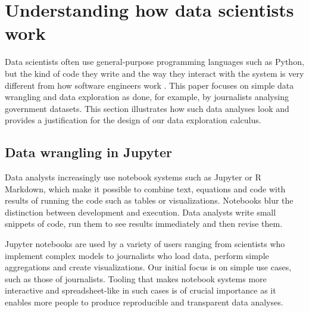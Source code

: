 \documentclass[acmsmall,anonymous,fleqn]{acmart}\settopmatter{printfolios=false,printccs=false,printacmref=false}
\theoremstyle{plain}
\theoremstyle{definition}
\begin{document}
\section{Understanding how data scientists work}
\label{sec:background}

Data scientists often use general-purpose programming languages such as Python, but the kind of
code they write and the way they interact with the system is very different from how software
engineers work \cite{workflow}. This paper focuses on simple data wrangling and data exploration as done, for
example, by journalists analysing government datasets. This section illustrates how such data
analyses look and provides a justification for the design of our data exploration calculus.


\subsection{Data wrangling in Jupyter}
\label{sec:background-jupyter}

Data analysts increasingly use notebook systems such as Jupyter or R Markdown, which
make it possible to combine text, equations and code with results of running the code such as tables
or visualizations. Notebooks blur the distinction between development and execution.
Data analysts write small snippets of code, run them to see results immediately and then revise
them.


Jupyter notebooks are used by a variety of users ranging from scientists who implement complex
models to journalists who load data, perform simple aggregations and create visualizations. Our
initial focus is on simple use cases, such as those of journalists. Tooling that makes notebook
systems more interactive and spreadsheet-like in such cases is of crucial importance as it enables
more people to produce reproducible and transparent data analyses.
\end{document}
